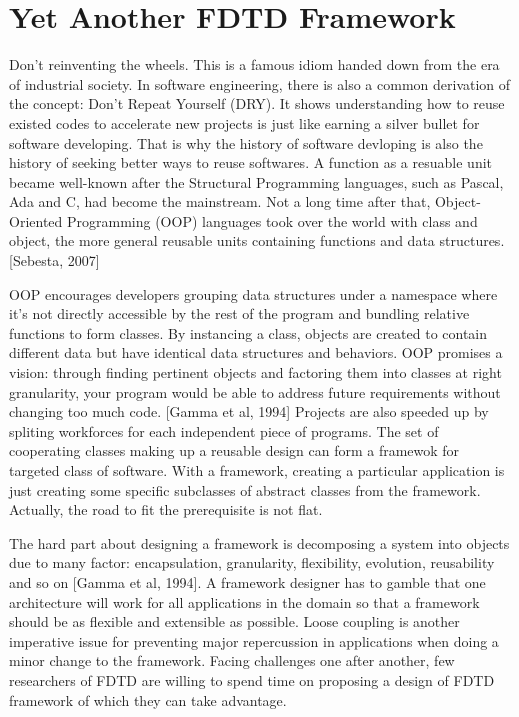 \section{Yet Another FDTD Framework}

Don't reinventing the wheels. This is a famous idiom handed down from the era of industrial society. In software
engineering, there is also a common derivation of the concept: Don't Repeat Yourself (DRY). It shows understanding how
to reuse existed codes to accelerate new projects is just like earning a silver bullet for software developing. That is
why the history of software devloping is also the history of seeking better ways to reuse softwares. A function as a
resuable unit became well-known after the Structural Programming languages, such as Pascal, Ada and C, had become the
mainstream. Not a long time after that, Object-Oriented Programming (OOP) languages took over the world with class and
object, the more general reusable units containing functions and data structures. [Sebesta, 2007]

OOP encourages developers grouping data structures under a namespace where it's not directly accessible by the rest of
the program and bundling relative functions to form classes. By instancing a class, objects are created to contain
different data but have identical data structures and behaviors. OOP promises a vision: through finding pertinent
objects and factoring them into classes at right granularity, your program would be able to address future requirements
without changing too much code. [Gamma et al, 1994] Projects are also speeded up by spliting workforces for each
independent piece of programs. The set of cooperating classes making up a reusable design can form a framewok for
targeted class of software. With a framework, creating a particular application is just creating some specific
subclasses of abstract classes from the framework. Actually, the road to fit the prerequisite is not flat.

The hard part about designing a framework is decomposing a system into objects due to many factor: encapsulation,
granularity, flexibility, evolution, reusability and so on [Gamma et al, 1994]. A framework designer has to gamble that
one architecture will work for all applications in the domain so that a framework should be as flexible and extensible
as possible. Loose coupling is another imperative issue for preventing major repercussion in applications when doing a
minor change to the framework. Facing challenges one after another, few researchers of FDTD are willing to spend time on
proposing a design of FDTD framework of which they can take advantage.

